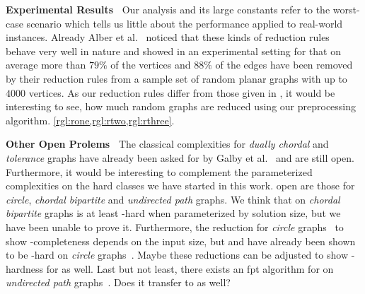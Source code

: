 \noindent \textbf{Experimental Results~}
Our analysis and its large constants refer to the worst-case scenario which tells us little about the performance applied to real-world instances.
Already Alber et al.~\cite{Alber2004} noticed that these kinds of reduction rules behave very well in nature and showed in an experimental setting for \pdom that on average more than $79\%$ of the vertices and $88\%$ of the edges have been removed by their reduction rules from a sample set of random planar graphs with up to $4000$ vertices. 
As our reduction rules differ from those given in \cite{Alber2004}, it would be interesting to see, how much random graphs are reduced using our preprocessing algorithm. \cref{rgl:rone,rgl:rtwo,rgl:rthree}.

\noindent \textbf{Other Open Prolems~}
The classical complexities for \textit{dually chordal} and \textit{tolerance} graphs have already been asked for by Galby et al.~\cite{Galby2020} and are still open.
Furthermore, it would be interesting to complement the parameterized complexities on the hard classes we have started in this work.
open are those for \textit{circle}, \textit{chordal bipartite} and \textit{undirected path} graphs.
We think that \sdoms on \textit{chordal bipartite} graphs is at least \WONEhs-hard when parameterized by solution size, but we have been unable to prove it.
Furthermore, the reduction for \textit{circle} graphs~\cite{Kloks2021} to show \NP-completeness depends on the input size, but \doms and \tdoms have already been shown to be \WONEhs-hard on \textit{circle} graphs~\cite{Bousquet2012}. 
Maybe these reductions can be adjusted to show \WONEhs-hardness for \sdoms as well.
Last but not least, there exists an fpt algorithm for \doms on \textit{undirected path} graphs~\cite{Figueiredo2022}. 
Does it transfer to \sdoms as well?